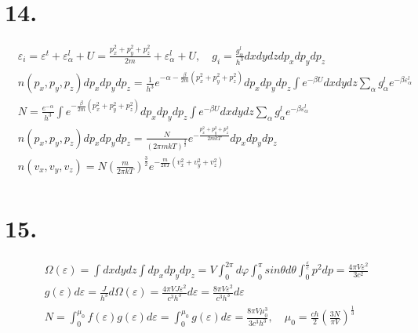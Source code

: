 \documentclass[UTF8]{ctexart}
\begin{document}
\section*{14.}
\begin{equation*}
  \begin{aligned}
     & \varepsilon_i=\varepsilon^t+\varepsilon_\alpha^l+U=\frac{p_x^2+p_y^2+p_z^2}{2m}+
    \varepsilon_\alpha^l+U,\quad g_i=\frac{g_\alpha^l}{h^3}dxdydzdp_xdp_ydp_z           \\
     & n(p_x,p_y,p_z)dp_xdp_ydp_z=\frac{1}{h^3}e^{-\alpha-\frac{\beta}{2m}(p_x^2+p_y^2+
    p_z^2)}dp_xdp_ydp_z\int e^{-\beta U}dxdydz\sum\limits_\alpha g_\alpha^le^{-\beta
    \varepsilon_\alpha^l}                                                               \\
     & N=\frac{e^{-\alpha}}{h^3}\int e^{-\frac{\beta}{2m}(p_x^2+p_y^2+p_z^2)}dp_xdp_y
    dp_z\int e^{-\beta U}dxdydz\sum\limits_\alpha g_\alpha^le^{-\beta\varepsilon_
    \alpha^l}                                                                           \\
     & n(p_x,p_y,p_z)dp_xdp_ydp_z=\frac{N}{(2\pi mkT)^\frac{3}{2}}e^{-\frac{p_x^2+p_y^2
    +p_z^2}{2mkT}}dp_xdp_ydp_z                                                          \\
     & n(v_x,v_y,v_z)=N(\frac{m}{2\pi kT})^\frac{3}{2}e^{-\frac{m}{2kT}(v_x^2+v_y^2+
    v_z^2)}                                                                             \\
  \end{aligned}
\end{equation*}
\section*{15.}
\begin{equation*}
  \begin{aligned}
     & \Omega(\varepsilon)=\int dxdydz\int dp_xdp_ydp_z=V\int_0^{2\pi}d\varphi\int_0^{\pi
    }sin\theta d\theta\int_0^\frac{\varepsilon}{c}p^2dp=\frac{4\pi V\varepsilon^2}{3c^
    2}                                                                                    \\
     & g(\varepsilon)d\varepsilon=\frac{J}{h^3}d\Omega(\varepsilon)=\frac{4\pi VJ
    \varepsilon^2}{c^3h^3}d\varepsilon=\frac{8\pi V\varepsilon^2}{c^3h^3}d\varepsilon     \\
     & N=\int_0^{\mu_0}f(\varepsilon)g(\varepsilon)d\varepsilon=\int_0^{\mu_0}g(
    \varepsilon)d\varepsilon=\frac{8\pi V\mu_0^3}{3c^3h^3},\quad\mu_0=\frac{ch}{2}
    (\frac{3N}{\pi V})^\frac{1}{3}                                                        \\
  \end{aligned}
\end{equation*}
\end{document}
